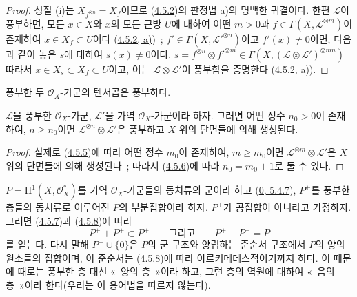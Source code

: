 \begin{proof}
성질 (i)는 $X_{f^{\otimes n}}=X_f$이므로
(\hyperref[II.4.5.2-ko]{4.5.2})의 판정법 a)의 명백한 귀결이다. 한편
$\mathcal{L}$이 풍부하면, 모든 $x\in X$와 $x$의 모든 근방 $U$에 대하여
어떤 $m>0$과 $f\in\Gamma(X,\mathcal{L}^{\otimes m})$이 존재하여
$x\in X_f\subset U$이다 (\hyperref[II.4.5.2-ko]{4.5.2, a)})~;
$f'\in\Gamma(X,\mathcal{L}'^{\otimes n})$이고 $f'(x)\neq0$이면,
다음과 같이 놓은 $s$에 대하여 $s(x)\neq0$이다.
$s=f^{\otimes n}\otimes f'^{\otimes m}\in
\Gamma(X,(\mathcal{L}\otimes\mathcal{L}')^{\otimes mn})$ 따라서
$x\in X_s\subset X_f\subset U$이고, 이는
$\mathcal{L}\otimes\mathcal{L}'$이 풍부함을 증명한다
(\hyperref[II.4.5.2-ko]{4.5.2, a)}).
\end{proof}

\begin{corollary}[4.5.7]
\label{II.4.5.7-ko}
풍부한 두 $\mathcal{O}_X$-가군의 텐서곱은 풍부하다.
\end{corollary}

\begin{corollary}[4.5.8]
\label{II.4.5.8-ko}
$\mathcal{L}$을 풍부한 $\mathcal{O}_X$-가군,
$\mathcal{L}'$을 가역 $\mathcal{O}_X$-가군이라 하자. 그러면 어떤 정수
$n_0>0$이 존재하여, $n\geq n_0$이면
$\mathcal{L}^{\otimes n}\otimes\mathcal{L}'$은 풍부하고 $X$ 위의
단면들에 의해 생성된다.
\end{corollary}

\begin{proof}
실제로 (\hyperref[II.4.5.5-ko]{4.5.5})에 따라 어떤 정수 $m_0$이
존재하여, $m\geq m_0$이면
$\mathcal{L}^{\otimes m}\otimes\mathcal{L}'$은 $X$ 위의 단면들에
의해 생성된다~; 따라서 (\hyperref[II.4.5.6-ko]{4.5.6})에 따라
$n_0=m_0+1$로 둘 수 있다.
\end{proof}

\begin{remark}[4.5.9]
\label{II.4.5.9-ko}
$P=\mathrm{H}^1(X,\mathcal{O}_X^*)$를 가역
$\mathcal{O}_X$-가군들의 동치류의 군이라 하고
(\hyperref[0.5.4.7-ko]{0, 5.4.7}), $P^+$를 풍부한 층들의 동치류로
이루어진 $P$의 부분집합이라 하자. $P^+$가 공집합이 아니라고 가정하자.
그러면 (\hyperref[II.4.5.7-ko]{4.5.7})과
(\hyperref[II.4.5.8-ko]{4.5.8})에 따라
\[
  P^++P^+\subset P^+
  \qquad\text{그리고}\qquad
  P^+-P^+=P
\]
를 얻는다. 다시 말해 $P^+\cup\{0\}$은 $P$의 군 구조와 양립하는
준순서 구조에서 $P$의 양의 원소들의 집합이며, 이 준순서는
(\hyperref[II.4.5.8-ko]{4.5.8})에 따라 아르키메데스적이기까지 하다.
이 때문에 때로는 풍부한 층 대신 «~양의 층~»이라 하고, 그런 층의
역원에 대하여 «~음의 층~»이라 한다(우리는 이 용어법을 따르지 않는다).
\end{remark}

